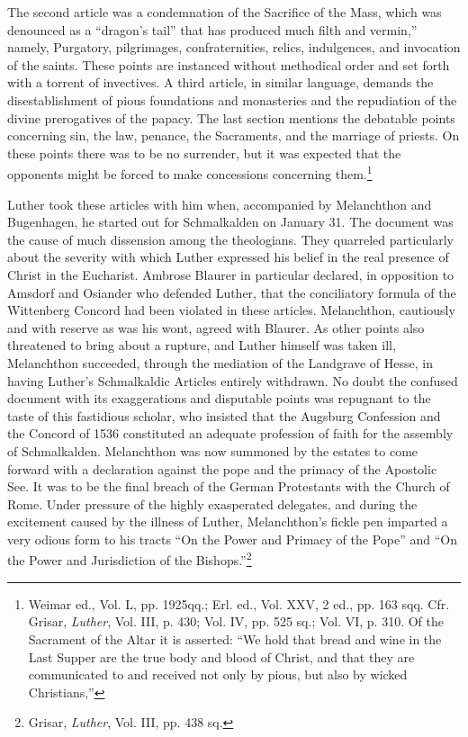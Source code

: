 The second article was a condemnation of the Sacrifice of the Mass,
which was denounced as a “dragon’s tail” that has produced much
filth and vermin,” namely, Purgatory, pilgrimages, confraternities,
relics, indulgences, and invocation of the saints. These points are instanced
without methodical order and set forth with a torrent of invectives. A
third article, in similar language, demands the disestablishment of pious
foundations and monasteries and the repudiation of
the divine prerogatives of the papacy. The last section mentions the
debatable points concerning sin, the law, penance, the Sacraments,
and the marriage of priests. On these points there was to be no surrender,
but it was expected that the opponents might be forced to
make concessions concerning them.\footnote
{Weimar ed., Vol. L, pp. 1925qq.; Erl. ed., Vol. XXV, 2 ed., pp. 163 sqq. Cfr. Grisar,
\textit{Luther}, Vol. III, p. 430; Vol. IV, pp. 525 sq.; Vol. VI, p. 310. Of the Sacrament of the
Altar it is asserted: “We hold that bread and wine in the Last Supper are the true body
and blood of Christ, and that they are communicated to and received not only by pious, but
also by wicked Christians,”}

Luther took these articles with him when, accompanied by Melanchthon and
Bugenhagen, he started out for Schmalkalden on January 31. The document
was the cause of much dissension among the
theologians. They quarreled particularly about the severity with
which Luther expressed his belief in the real presence of Christ in the
Eucharist. Ambrose Blaurer in particular declared, in opposition to
Amsdorf and Osiander who defended Luther, that the conciliatory
formula of the Wittenberg Concord had been violated in these articles.
Melanchthon, cautiously and with reserve as was his wont,
agreed with Blaurer. As other points also threatened to bring about a
rupture, and Luther himself was taken ill, Melanchthon succeeded,
through the mediation of the Landgrave of Hesse, in having Luther’s
Schmalkaldic Articles entirely withdrawn. No doubt the confused
document with its exaggerations and disputable points was repugnant
to the taste of this fastidious scholar, who insisted that the Augsburg
Confession and the Concord of 1536 constituted an adequate profession
of faith for the assembly of Schmalkalden. Melanchthon was now
summoned by the estates to come forward with a declaration against
the pope and the primacy of the Apostolic See. It was to be the final
breach of the German Protestants with the Church of Rome. Under
pressure of the highly exasperated delegates, and during the excitement
caused by the illness of Luther, Melanchthon’s fickle pen imparted a very
odious form to his tracts “On the Power and Primacy
of the Pope” and “On the Power and Jurisdiction of the Bishops.”\footnote{Grisar, \textit{Luther}, Vol. III, pp. 438 sq.}

